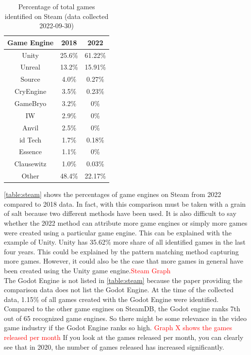 \begin{table}[h!]
    \centering
    \begin{tabular}{|c c c|}
        \hline
        Game Engine & 2018   & 2022    \\
        \hline\hline
        Unity       & 25.6\% & 61.22\% \\
        Unreal      & 13.2\% & 15.91\% \\
        Source      & 4.0\%  & 0.27\%  \\
        CryEngine   & 3.5\%  & 0.23\%  \\
        GameBryo    & 3.2\%  & 0\%     \\
        IW          & 2.9\%  & 0\%     \\
        Anvil       & 2.5\%  & 0\%     \\
        id Tech     & 1.7\%  & 0.18\%  \\
        Essence     & 1.1\%  & 0\%     \\
        Clausewitz  & 1.0\%  & 0.03\%  \\
        Other       & 48.4\% & 22.17\% \\
        \hline
    \end{tabular}
    \caption{Percentage of total games identified on Steam (data collected 2022-09-30)}
    \label{table:steam}
\end{table}

\autoref{table:steam} shows the percentages of game engines on Steam from 2022 compared to 2018 data.
In fact, with this comparison must be taken with a grain of salt because two different methods have been used.
It is also difficult to say whether the 2022 method can attribute more game engines or simply more games were created using a particular game engine.
This can be explained with the example of Unity.
Unity has 35.62\% more share of all identified games in the last four years.
This could be explained by the pattern matching method capturing more games.
However, it could also be the case that more games in general have been created using the Unity game engine.\textcolor{red}{Steam Graph} \\


The Godot Engine is not listed in \autoref{table:steam} because the paper providing the comparison data does not list the Godot Engine.
At the time of the collected data, 1.15\% of all games created with the Godot Engine were identified.
Compared to the other game engines on SteamDB, the Godot engine ranks 7th out of 65 recognized game engines.
So there might be some relevance in the video game industry if the Godot Engine ranks so high.
\textcolor{red}{Graph X shows the games released per month}
If you look at the games released per month, you can clearly see that in 2020, the number of games released has increased significantly.\\

